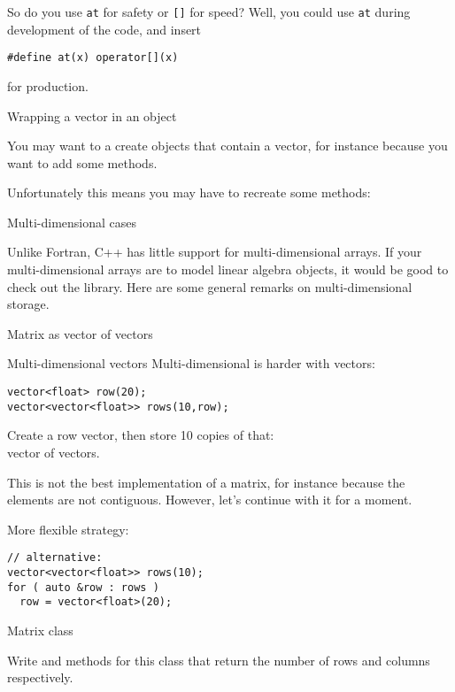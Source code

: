 So do you use \lstinline{at} for safety or \lstinline{[]} for speed? Well, you could
use \lstinline{at} during development of the code, and insert
\begin{lstlisting}
#define at(x) operator[](x)
\end{lstlisting}
for production.

 {Wrapping a vector in an object}

You may want to a create objects that contain a vector, for instance
because you want to add some methods.
%

Unfortunately this means you may have to recreate some methods:
%

 {Multi-dimensional cases}

Unlike Fortran, C++ has little support for multi-dimensional
arrays. If your multi-dimensional arrays are to model linear algebra
objects, it would be good to check out the 
library. Here are some general remarks on multi-dimensional storage.

 {Matrix as vector of vectors}

\begin{block}{Multi-dimensional vectors}
  \label{sl:multi-vector}
  Multi-dimensional is harder with vectors:
\begin{lstlisting}
vector<float> row(20);
vector<vector<float>> rows(10,row);
\end{lstlisting}
Create a row vector, then store 10 copies of that:\\
vector of vectors.
\end{block}

This is not the best implementation of a matrix, for instance because
the elements are not contiguous. However, let's continue with it for a moment.

\begin{remark}
More flexible strategy:
\begin{lstlisting}
// alternative:
vector<vector<float>> rows(10);
for ( auto &row : rows )
  row = vector<float>(20);
\end{lstlisting}
\end{remark}

\begin{block}{Matrix class}
  \label{sl:matrix-class}
\end{block}

\begin{exercise}
  \label{ex:matrixclass-rowcol1}
  Write  and  methods for this class that return
  the number of rows and columns respectively.
\end{exercise}

